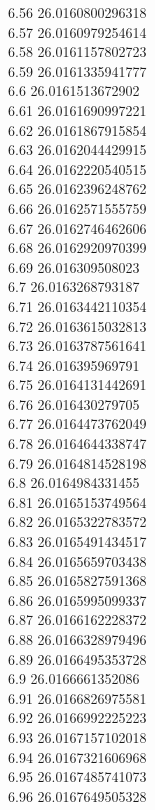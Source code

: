 {6.56	26.0160800296318\\
6.57	26.0160979254614\\
6.58	26.0161157802723\\
6.59	26.0161335941777\\
6.6	26.0161513672902\\
6.61	26.0161690997221\\
6.62	26.0161867915854\\
6.63	26.0162044429915\\
6.64	26.0162220540515\\
6.65	26.0162396248762\\
6.66	26.0162571555759\\
6.67	26.0162746462606\\
6.68	26.0162920970399\\
6.69	26.016309508023\\
6.7	26.0163268793187\\
6.71	26.0163442110354\\
6.72	26.0163615032813\\
6.73	26.0163787561641\\
6.74	26.016395969791\\
6.75	26.0164131442691\\
6.76	26.016430279705\\
6.77	26.0164473762049\\
6.78	26.0164644338747\\
6.79	26.0164814528198\\
6.8	26.0164984331455\\
6.81	26.0165153749564\\
6.82	26.0165322783572\\
6.83	26.0165491434517\\
6.84	26.0165659703438\\
6.85	26.0165827591368\\
6.86	26.0165995099337\\
6.87	26.0166162228372\\
6.88	26.0166328979496\\
6.89	26.0166495353728\\
6.9	26.0166661352086\\
6.91	26.0166826975581\\
6.92	26.0166992225223\\
6.93	26.0167157102018\\
6.94	26.0167321606968\\
6.95	26.0167485741073\\
6.96	26.0167649505328\\
}
